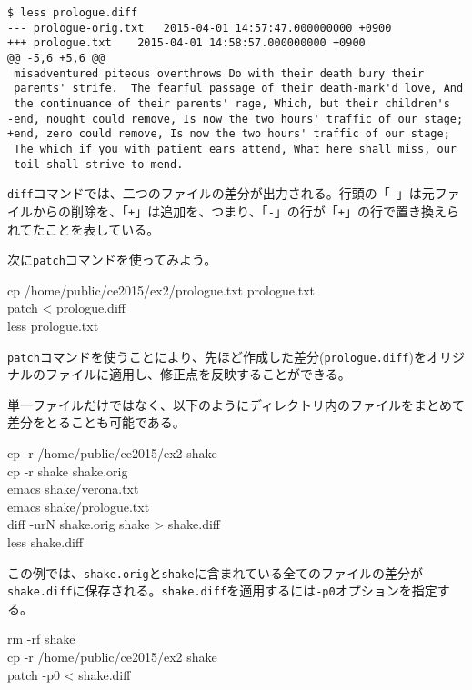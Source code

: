 \begin{reidai}
\begin{verbatim}
$ less prologue.diff
--- prologue-orig.txt	2015-04-01 14:57:47.000000000 +0900
+++ prologue.txt	2015-04-01 14:58:57.000000000 +0900
@@ -5,6 +5,6 @@
 misadventured piteous overthrows Do with their death bury their
 parents' strife.  The fearful passage of their death-mark'd love, And
 the continuance of their parents' rage, Which, but their children's
-end, nought could remove, Is now the two hours' traffic of our stage;
+end, zero could remove, Is now the two hours' traffic of our stage;
 The which if you with patient ears attend, What here shall miss, our
 toil shall strive to mend.
\end{verbatim}
\end{reidai} \noindent
{\tt diff}コマンドでは、二つのファイルの差分が出力される。行頭の「{\tt -}」は元ファイルからの削除を、「{\tt +}」は追加を、つまり、「{\tt -}」の行が「{\tt +}」の行で置き換えられてたことを表している。

次に{\tt patch}コマンドを使ってみよう。
\begin{commandline2}
\prompt cp /home/public/ce2015/ex2/prologue.txt prologue.txt \\
\prompt patch < prologue.diff \\
\prompt less prologue.txt
\end{commandline2} \noindent
{\tt patch}コマンドを使うことにより、先ほど作成した差分({\tt prologue.diff})をオリジナルのファイルに適用し、修正点を反映することができる。

単一ファイルだけではなく、以下のようにディレクトリ内のファイルをまとめて差分をとることも可能である。
\begin{commandline2}
\prompt cp -r /home/public/ce2015/ex2 shake \\
\prompt cp -r shake shake.orig \\
\prompt emacs shake/verona.txt \\
\prompt emacs shake/prologue.txt \\
\prompt diff -urN shake.orig shake > shake.diff \\
\prompt less shake.diff
\end{commandline2} \noindent
この例では、{\tt shake.orig}と{\tt shake}に含まれている全てのファイルの差分が{\tt shake.diff}に保存される。{\tt shake.diff}を適用するには{\tt -p0}オプションを指定する。
\begin{commandline2}
\prompt rm -rf shake \\
\prompt cp -r /home/public/ce2015/ex2 shake \\
\prompt patch -p0 < shake.diff
\end{commandline2}

